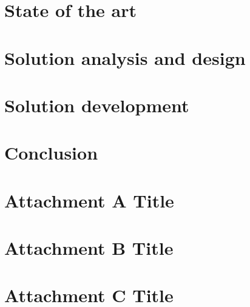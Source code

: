 \documentclass[openany,11pt,twoside,a4paper]{report}
\begin{document}
\chapter{State of the art}
\label{state-of-the-art}

\newpage\cleardoublepage

\chapter{Solution analysis and design} \label{cap:solution-analysis-and-design}

\newpage\cleardoublepage

\chapter{Solution development}
\label{cap:solution-development}

\newpage\cleardoublepage

\chapter{Conclusion}

\newpage\cleardoublepage


\renewcommand\bibname{Bibliography}
 
   




\begin{appendix}

\renewcommand{\appendixname}{Attachment}

\renewcommand{\appendixname}{Attachment}

\chapter{Attachment A Title}
\label{attachment-a}

\newpage
\cleardoublepage

\chapter{Attachment B Title}
\label{attachment-b}

\newpage
\cleardoublepage

\chapter{Attachment C Title}
\label{attachment-c}

\newpage
\cleardoublepage

\end{appendix}
\end{document}

